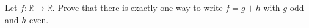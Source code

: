 Let $f:\mathbb R\to\mathbb R$. Prove that there is exactly one way to write $f=g+h$ with $g$ odd and $h$ even.
